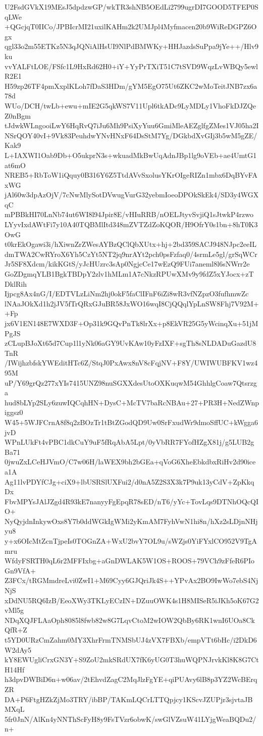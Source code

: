 U2FsdGVkX19MEsJ5dpdzwGP/wkTR3shNB5OEdLi2799ugrDI7GOOD5TFEP0SqLWe
+QGcjqT0IICo/JPBIcrMI21uxilKAHm2k2UMJpl4Myfmacen20b9WiReDGPZ6Ogx
qgl33o2m55ETKz5N3qJQNiAlHsUI9NlPdBMWKy+HHJazdsSuPpa9jYe++/Hlv9ku
vvYALFtLOE/FSfc1L9HxRd62H0+iY+YyPrTXiT51C7tSVD9WqzLvWBQy5ewlR2E1
H59zp26TF4pmXxplKLoh7fDaS3HDm/gYM5EgO75Ut6ZKC2wMoTeitJNB7zx6a78d
WUo/DCH/twLb+ewu+mIE2G5qkWS7V11Upl6tkADc9LyMDLy1VhoFkDJZQeZ0nBgm
tJdwkWLngooiLwY6HqRvQ7iJu6Mh9PsiXyYuu6GmiMleAEZglfgZMes1VJ05ha2I
NSrQOY40vI+9Vk83PeuhdwYNvHNxF64DsStM7Yg/DGkbdXvGIj3b5wM5gZE/Kak9
L+IAXWI1Oab9Db+O5ukprN3s+wkuadMkBwUqAdnJBp1lg9oVEb+ae4UmtG1at6mO
NREB5+RbToW1iQquy0B316Y6Z5TtdAVvSxolusYKrOIgeRIZn1mbx6DqBYvFAxWG
jAl60w3dpAzOjV/7cNwMlySotDVwugVurG32yebmIoeoDPOkSkEk4/SD3y4WGXqC
mPBBkHI70LnNb74ut6WI8l94Jpir8E/vHIuRRB/nOELJtyvSvjiQ1sJtwkP4rzwo
LYyvIxdAWtFi7y10A40TQBMlItd348mZVTZdZoKQOR/H9OfrY0s1bn+8hT0K3OwG
t0krEkOgawi3i/hXiwnZrZWesAYBzQClQbXUtx+hj+2bd359SACJ948NJpc2eeIL
dmTWA2CwRYroX6Yh5CzYt5NT2jq9nrAYt2pch0psFzfaq0/4srmLe5gl/grSqWCr
Jr5SF8Xdcm/kikKGtS/yJcHUzrc3sAp0NgjcCe17wEzQ9FUi7aneml8l6sNWrr2e
GoZDgmqYLB1BgkTBDpY2zlv1hMLm1A7cNkzRPUwXMv9y9fdZ5xYJocx+zTDklRih
Ijpcg8Ax4nG/I/EDTVLzLiNm2hj0okF5faClIFnF6iZi8wR3vfNZpzO3fufhmwZc
lNAaJOkXd1h2jJV5fTrQRxGJuBR58JxWO16wqI8CjQQqlYpLnSW8Fhj7V92M++Fp
jx6V1EN148E7WXD3F+Op31k9GQvPnTk8lrXx+p8EkVR25G5yWcinqXu+51jMPgJS
zCLupBJoXt65d7Cup1l1yNk06aGY9UvKAw10yFzIXF+sgTh8sNLDADuGazdU8TnR
/IWijhzbfskYWEditHTc6Z/StqJ0PxAwx8nV8cFqjNV+F8Y/UWIWUBFKV1wz495M
uP/Y69grQz277xYIs7415UNZ98nuSGXXdesUtoOXKuqwM54GhhlgCoaw7Qtsrzga
hud8bLYp2SLy6zuwIQCqhHN+DysC+McTV7baRcNBAu+27+PR3H+NedZWnpiggsz0
W45+5WJFCrnA8f8q2zBOzTr1tBtZGodQD9Uw0SrFxudWr9dmoSffUC+kWgga6jvD
WPnLUkFt4vPBC1dkCuY9uF5fRqAbA5Lpt/0yVbRR7FYofHZgX81j/g5LUB2gBa71
0jwuZxLCeHJVmO/C7w06H/laWEX9bh2bGEa+qVoG6XheEbkdbxRiHv2d90icea1A
Ag11lvPDYfCJg+ciX9+lbUSRSlUXFui2/d0nA5Z2S3X3k7P9uk13yCdV+ZpKkqDx
FbvMPYsJAlJZgd4R93kE7nanyyFgEpqR78sED/nT6/yYc+TovLqs9DTNhOQcQIO+
NyQyjdnInkywOxs8Y7b0ddWGkIgWMi2yKmAM7FyhVwN1hi8n/hXz2sLDjnNHjyu8
y+x6OIcMtZcnTjpeIs0TOGnZA+WxU2bvY7OL9u/sWZjs0YiFYxlCO952V9TgAmru
WfdyFSRTH0qL6r2MFFIxbg+aGnDWLAK5W1OS+ROOS+79VCh9zFfeR6PIoGn9VfA+
Z3FCx/tRGMmdreLvi0ZwI1+M69Cyy6GJQriJk4S++YPvAx2BO9IwWo7ebS4NjNjS
xDdNU5RQ6IzB/EeoXWy3TKLyECzIN+DZuuOWK4s1H8MISeR5iJKh5oK67G2vMl5g
NDqXQJFLAaOph8085l8fwb82w8G7LqvCtoM2wIOW2QbBy6RK1wnI6UOa8CkQfR+Z
t5YD0URzCmZahm0MY3XhrFrmTNMSbUJ4zVX7FBXb/empVTt6bHc/i2DkD6W2dAy5
kY8EWUgliCrxGN3Y+S9ZoU2mkSRdUX7fK6yUG0T3huWQPNJrvkKl8K8G7CtH14Hf
h3dpvDWBiD6n+w06av/2tEhvdZagC2MqJlzFgYE+qiPUAvy6lB8p3YZ2WcBErqZR
DA+P6FtgHZkZjMo3TRY/ibBP/TAKmLQCrLTTQpjcy1KScvJZUPjr3sjvtaJBMXqL
5fr0JnN/AlKn4yNNThScFyH8y9FsTVzr6obwK/swGlVZsuW41LYjgWeaBQDu2/n+
